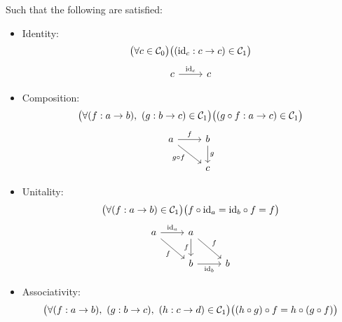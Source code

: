 \begin{definition}
  Such that the following are satisfied:
  \begin{itemize}
    \item Identity:
      \[\big(\forall c \in \mathcal{C}_0\big)
        \big((\mathrm{id}_c : c\to c)\in \mathcal{C}_1\big)\]
      \[\begin{tikzcd}[ampersand replacement=\&]
        c \& c
        \arrow["{\id_c}", from=1-1, to=1-2]
      \end{tikzcd}\]
    \item Composition:
      \[\big(\forall (f :a \to b),\ (g : b\to c) \in \mathcal{C}_1\big)
        \big((g\circ f :a\to c) \in \mathcal{C}_1\big)\]
      \[\begin{tikzcd}[ampersand replacement=\&]
        a \& b \\
        \& c
        \arrow["f", from=1-1, to=1-2]
        \arrow["g", from=1-2, to=2-2]
        \arrow["{g\circ f}"'{pos=0.4}, from=1-1, to=2-2]
      \end{tikzcd}\]
    \item Unitality:
      \[\big(\forall (f:a\to b)\in \mathcal{C}_1\big)
        \big(f \circ \mathrm{id}_a = \mathrm{id}_b \circ f = f\big)\]
      \[\begin{tikzcd}[ampersand replacement=\&]
        a \& a \\
        \& b \& b
        \arrow["f"', from=1-2, to=2-2]
        \arrow["{\id_b}"', from=2-2, to=2-3]
        \arrow["{\id_a}", from=1-1, to=1-2]
        \arrow["f"', from=1-1, to=2-2]
        \arrow["f", from=1-2, to=2-3]
      \end{tikzcd}\]
    \item Associativity:
      \[\big(\forall (f : a\to b),\ (g: b\to c),\ (h: c\to d)\in\mathcal{C}_1\big)
        \big((h \circ g) \circ f = h \circ (g \circ f)\big)\]

\end{itemize}
\end{definition}
